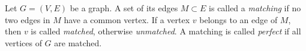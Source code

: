 \begin{dfn}
Let $G = (V, E)$ be a graph.
A set of its edges $M \subset E$ is called a \emph{matching} if no two edges in $M$ have a common vertex.
If a vertex $v$ belongs to an edge of $M$, then $v$ is called \emph{matched}, otherwise \emph{unmatched}.
A matching is called \emph{perfect} if all vertices of $G$ are matched.
\end{dfn}